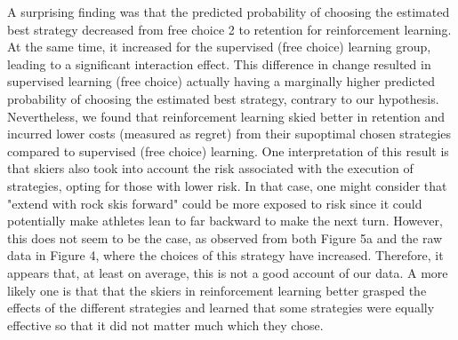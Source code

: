 A surprising finding was that the predicted probability of choosing the estimated best strategy decreased from free choice 2 to retention for reinforcement learning. At the same time, it increased for the supervised (free choice) learning group, leading to a significant interaction effect. This difference in change resulted in supervised learning (free choice) actually having a marginally higher predicted probability of choosing the estimated best strategy, contrary to our hypothesis. Nevertheless, we found that reinforcement learning skied better in retention and incurred lower costs (measured as regret) from their supoptimal chosen strategies compared to supervised (free choice) learning. One interpretation of this result is that skiers also took into account the risk associated with the execution of strategies, opting for those with lower risk. In that case, one might consider that "extend with rock skis forward" could be more exposed to risk since it could potentially make athletes lean to far backward to make the next turn.  However, this does not seem to be the case, as observed from both Figure 5a and the raw data in Figure 4, where the choices of this strategy have increased. Therefore, it appears that, at least on average, this is not a good account of our data. A more likely one is that that the skiers in reinforcement learning better grasped the effects of the different strategies and learned that some strategies were equally effective so that it did not matter much which they chose.

